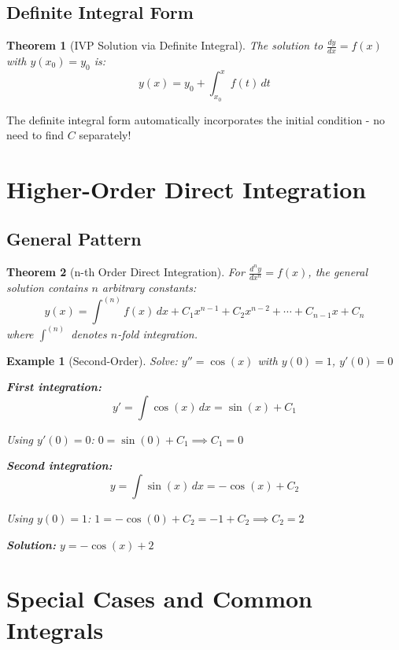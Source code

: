 \documentclass[12pt]{article}
\newtheorem{theorem}{Theorem}
\newtheorem{example}{Example}
\begin{document}
\subsection{Definite Integral Form}

\begin{theorem}[IVP Solution via Definite Integral]
The solution to $\frac{dy}{dx} = f(x)$ with $y(x_0) = y_0$ is:
$$y(x) = y_0 + \int_{x_0}^{x} f(t)\,dt$$
\end{theorem}

\begin{insight}
The definite integral form automatically incorporates the initial condition - no need to find $C$ separately!
\end{insight}

\section{Higher-Order Direct Integration}

\subsection{General Pattern}

\begin{theorem}[n-th Order Direct Integration]
For $\frac{d^n y}{dx^n} = f(x)$, the general solution contains $n$ arbitrary constants:
$$y(x) = \int^{(n)} f(x)\,dx + C_1 x^{n-1} + C_2 x^{n-2} + \cdots + C_{n-1}x + C_n$$
where $\int^{(n)}$ denotes $n$-fold integration.
\end{theorem}

\begin{example}[Second-Order]
Solve: $y'' = \cos(x)$ with $y(0) = 1$, $y'(0) = 0$

\textbf{First integration:}
$$y' = \int \cos(x)\,dx = \sin(x) + C_1$$

Using $y'(0) = 0$: $0 = \sin(0) + C_1 \implies C_1 = 0$

\textbf{Second integration:}
$$y = \int \sin(x)\,dx = -\cos(x) + C_2$$

Using $y(0) = 1$: $1 = -\cos(0) + C_2 = -1 + C_2 \implies C_2 = 2$

\textbf{Solution:} $y = -\cos(x) + 2$
\end{example}

\section{Special Cases and Common Integrals}
\end{document}
